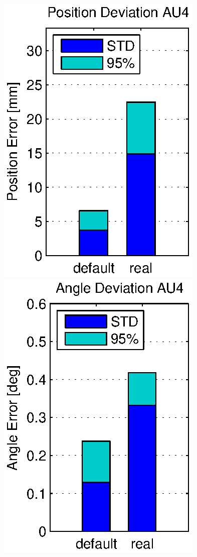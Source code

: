 \begin{figure}[hbtp]
\centering
\includegraphics[scale=.72]{images/results/err_cmp_real_pos.eps}
\includegraphics[scale=.72]{images/results/err_cmp_real_angle.eps}\\

\end{figure}
